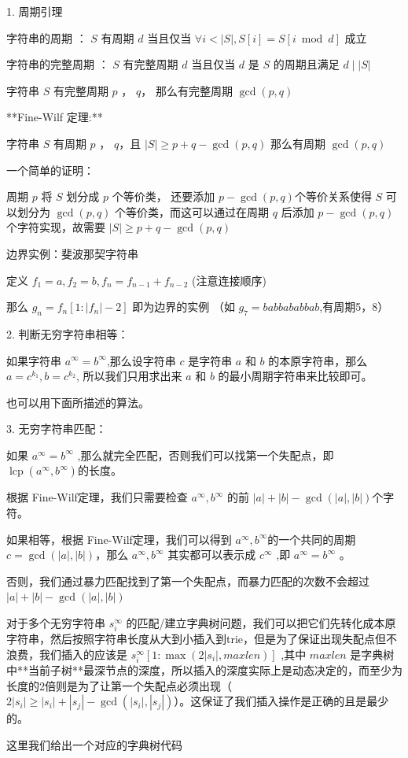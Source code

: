 1. 周期引理

字符串的周期 ： $S$ 有周期  $d$ 当且仅当 $\forall i<|S|, S[i] = S[i \bmod d]$ 成立

字符串的完整周期 ： $S$ 有完整周期 $d$ 当且仅当 $d$ 是 $S$ 的周期且满足 $d \mid \lvert S \rvert$

字符串 $S$ 有完整周期 $p$ ， $q$， 那么有完整周期 $\gcd(p,q)$

**Fine-Wilf 定理:**

字符串 $S$ 有周期 $p$ ， $q$，且 $|S| \geq p + q - \gcd(p,q)$ 那么有周期 $\gcd(p,q)$

一个简单的证明：

周期 $p$ 将 $S$ 划分成 $p$ 个等价类， 还要添加 $p - \gcd(p,q)$个等价关系使得 $S$ 可以划分为 $\gcd(p,q)$ 个等价类，而这可以通过在周期 $q$ 后添加  $p - \gcd(p,q)$个字符实现，故需要  $|S| \geq p + q - \gcd(p,q)$ 

边界实例：斐波那契字符串

定义 $f_1 = a , f_2 = b, f_n = f_{n - 1} + f_{n - 2}$ (注意连接顺序)

那么 $g_n = f_n[1: |f_n| - 2]$ 即为边界的实例 （如 $g_7 = babbababbab$,有周期5，8）

2. 判断无穷字符串相等：

如果字符串 $a^{\infty} = b^{\infty}$,那么设字符串 $c$ 是字符串 $a$  和 $b$ 的本原字符串，那么 $a = c^{k_1}, b = c^{k_2}$, 所以我们只用求出来 $a$ 和 $b$ 的最小周期字符串来比较即可。

也可以用下面所描述的算法。

3. 无穷字符串匹配：

如果 $a^{\infty} = b^{\infty}$ ,那么就完全匹配，否则我们可以找第一个失配点，即 $\operatorname{lcp}(a^{\infty},b^{\infty})$的长度。

根据 Fine-Wilf定理，我们只需要检查 $a^{\infty} , b^{\infty}$ 的前 $|a| + |b| - \gcd(|a|,|b|)$个字符。

如果相等，根据 Fine-Wilf定理，我们可以得到 $a^{\infty} , b^{\infty}$的一个共同的周期 $c = \gcd(|a|,|b|)$，那么 $a^{\infty} , b^{\infty}$ 其实都可以表示成 $c^{\infty}$ ,即 $a^{\infty} = b^{\infty}$ 。

否则，我们通过暴力匹配找到了第一个失配点，而暴力匹配的次数不会超过 $|a| + |b| - \gcd(|a|,|b|)$

对于多个无穷字符串 $s^{\infty}_i$ 的匹配/建立字典树问题，我们可以把它们先转化成本原字符串，然后按照字符串长度从大到小插入到trie，但是为了保证出现失配点但不浪费，我们插入的应该是 $s^{\infty}_i [1 : \max(2|s_i|, maxlen)]$ ,其中 $maxlen$ 是字典树中**当前子树**最深节点的深度，所以插入的深度实际上是动态决定的，而至少为长度的2倍则是为了让第一个失配点必须出现（ $2|s_i| \geq |s_i| + |s_j| - \gcd(|s_i|,|s_j|)$）。这保证了我们插入操作是正确的且是最少的。

这里我们给出一个对应的字典树代码